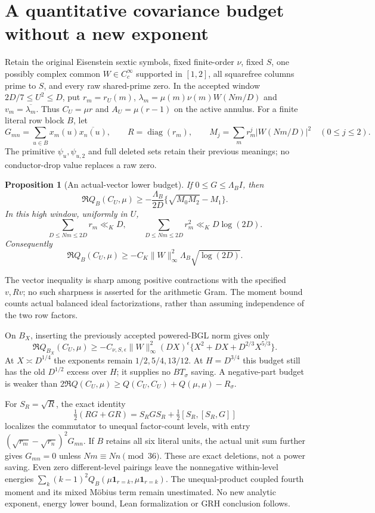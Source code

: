 \documentclass[11pt]{article}
\newtheorem{proposition}[theorem]{Proposition}
\theoremstyle{definition}\newtheorem{definition}[theorem]{Definition}
\theoremstyle{remark}\newtheorem{remark}[theorem]{Remark}
\begin{document}
\section{A quantitative covariance budget without a new exponent}\label{cbq:core}
Retain the original Eisenstein sextic symbols, fixed finite-order $\nu$,
fixed $S$, one possibly complex common $W\in C_c^\infty$ supported in
$[1,2]$, all squarefree columns prime to $S$, and every raw shared-prime
zero. In the accepted window $2D/7\le U^2\le D$, put $r_m=r_U(m)$,
$\lambda_m=\mu(m)\nu(m)W(Nm/D)$ and $v_m=\overline{\lambda_m}$.
Thus $C_U=\mu r$ and $A_U=\mu(r-1)$ on the active annulus.
For a finite literal row block $B$, let
\[
 G_{mn}=\sum_{u\in B}x_m(u)\overline{x_n(u)},\qquad
 R=\operatorname{diag}(r_m),\qquad
 M_j=\sum_mr_m^j|W(Nm/D)|^2\quad(0\le j\le2).
\]
The primitive $\psi_u,\psi_{u,2}$ and full deleted sets retain their
previous meanings; no conductor-drop value replaces a raw zero.

\begin{proposition}[An actual-vector lower budget]\label{cbq:budget}
If $0\le G\le\Lambda_B I$, then
\begin{equation}\label{cbq:vector}
 \Re Q_B(C_U,\mu)\ge
 -\frac{\Lambda_B}{2D}\{\sqrt{M_0M_2}-M_1\}.
\end{equation}
In this high window, uniformly in $U$,
\begin{equation}\label{cbq:moments}
 \sum_{D\le Nm\le2D}r_m\ll_K D,\qquad
 \sum_{D\le Nm\le2D}r_m^2\ll_K D\log(2D).
\end{equation}
Consequently
\[
 \Re Q_B(C_U,\mu)\ge
 -C_K\|W\|_\infty^2\Lambda_B\sqrt{\log(2D)}.
\]
\end{proposition}
The vector inequality is sharp among positive contractions with the
specified $v,Rv$; no such sharpness is asserted for the arithmetic Gram.
The moment bound counts actual balanced ideal factorizations, rather than
assuming independence of the two row factors.

On $B_X$, inserting the previously accepted powered-BGL norm gives only
\[
 \Re Q_{B_X}(C_U,\mu)\ge
 -C_{\nu,S,\epsilon}\|W\|_\infty^2(DX)^\epsilon
 \{X^2+DX+D^{2/3}X^{5/3}\}.
\]
At $X\asymp D^{1/4}$ the exponents remain $1/2,5/4,13/12$.
At $H=D^{3/4}$ this budget still has the old $D^{1/2}$ excess over $H$;
it supplies no $BT_\sigma$ saving. A negative-part budget is weaker than
$2\Re Q(C_U,\mu)\ge Q(C_U,C_U)+Q(\mu,\mu)-R_\sigma$.

For $S_R=\sqrt R$, the exact identity
\[
 \tfrac12(RG+GR)=S_RGS_R+\tfrac12[S_R,[S_R,G]]
\]
localizes the commutator to unequal factor-count levels, with entry
$(\sqrt{r_m}-\sqrt{r_n})^2G_{mn}$. If $B$ retains all six literal units,
the actual unit sum further gives $G_{mn}=0$ unless $Nm\equiv Nn\pmod{36}$.
These are exact deletions, not a power saving. Even zero different-level
pairings leave the nonnegative within-level energies
$\sum_k(k-1)^2Q_B(\mu\mathbf1_{r=k},\mu\mathbf1_{r=k})$.
The unequal-product coupled fourth moment and its mixed M\"obius term
remain unestimated. No new analytic exponent, energy lower bound,
Lean formalization or GRH conclusion follows.
\end{document}
